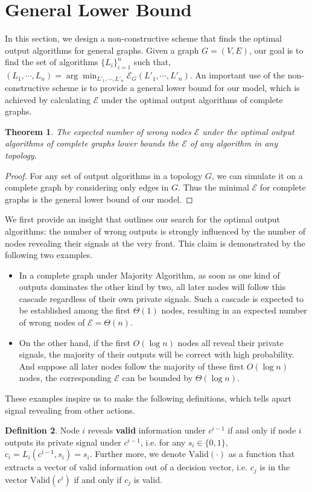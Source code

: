 \documentclass[a4paper,UKenglish]{lipics}
\newtheorem{thm}{Theorem}[section] %
\theoremstyle{definition}
\newtheorem{defn}[thm]{Definition}
\begin{document}
\section{General Lower Bound}
In this section, we design a non-constructive scheme that finds the optimal output algorithms for general graphs.
Given a graph $G = (V, E)$, our goal is to find the set of algorithms $\{L_i\}_{i=1}^{n}$ such that,
$
	(L_1, \dotsb, L_n)
=
	\arg\min_{L'_1, \dotsb, L'_n} \mathcal{E}_{G}(L'_1,\dotsb, L'_n).
$
An important use of the non-constructive scheme is to provide a general lower bound for our model,
	 which is achieved by calculating $\mathcal{E}$ under the optimal output algorithms of complete graphs.

\begin{thm}
\label{thm:complete graphs bound}
The expected number of wrong nodes $\mathcal{E}$ under the optimal output algorithms of complete graphs
	 lower bounds the $\mathcal{E}$ of any algorithm in any topology.
\end{thm}
\begin{proof}
For any set of output algorithms in a topology $G$, we can simulate it on a complete graph by considering only edges in $G$.
Thus the minimal $\mathcal{E}$ for complete graphs is the general lower bound of our model.
\end{proof}

We first provide an insight that outlines our search for the optimal output algorithms:
	the number of wrong outputs is strongly influenced by the number of nodes revealing their signals at the very front.
This claim is demonstrated by the following two examples.
\begin{itemize}
\item In a complete graph under Majority Algorithm, 
		as soon as one kind of outputs dominates the other kind by two,
		all later nodes will follow this cascade regardless of their own private signals.
	Such a cascade is expected to be established among the first $\Theta(1)$ nodes,
		resulting in an expected number of wrong nodes of $\mathcal{E} = \Theta(n)$.
\item	On the other hand, if the first $O(\log n)$ nodes all reveal their private signals, 
		the majority of their outputs will be correct with high probability.
	And suppose all later nodes follow the majority of these first $O(\log n)$ nodes, 
		the corresponding $\mathcal{E}$ can be bounded by $\Theta(\log n)$.
\end{itemize}
These examples inspire us to make the following definitions, which tells apart signal revealing from other actions.
\begin{defn}
Node $i$ reveals \textbf{valid} information under $c^{i-1}$ 
	if and only if node $i$ outputs its private signal under $c^{i-1}$, 
	i.e. for any $s_i\in \{0,1\}$, $c_i = L_i(c^{i-1}, s_i) = s_i$.
Further more, we denote $\text{Valid}(\cdot)$ as a function that extracts a vector of valid information out of a decision vector, i.e. 
	$c_j$ is in the vector $\text{Valid}(c^{i})$ if and only if $c_j$ is valid.
\end{defn}
\end{document}
